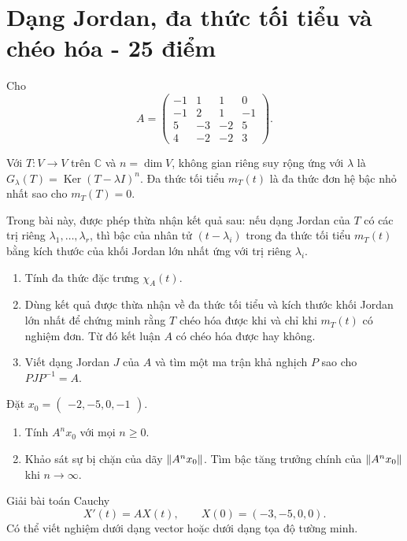 ﻿\documentclass[12pt,a4paper]{article}
\providecommand{\C}{\mathbb{C}}
\DeclareMathOperator{\Ker}{Ker}
\begin{document}
\section[Dạng Jordan, đa thức tối tiểu và chéo hóa]{Dạng Jordan, đa thức tối tiểu và chéo hóa - 25 điểm}

Cho
\[
A=
\begin{pmatrix}
-1&1&1&0\\
-1&2&1&-1\\
5&-3&-2&5\\
4&-2&-2&3
\end{pmatrix}.
\]

Với $T:V\to V$ trên $\C$ và $n=\dim V$, không gian riêng suy rộng ứng với $\lambda$ là $G_\lambda(T)=\Ker(T-\lambda I)^n$. Đa thức tối tiểu $m_T(t)$ là đa thức đơn hệ bậc nhỏ nhất sao cho $m_T(T)=0$.

Trong bài này, được phép thừa nhận kết quả sau: nếu dạng Jordan của \(T\) có các trị riêng
\(\lambda_1,\ldots,\lambda_r\), thì bậc của nhân tử \((t-\lambda_i)\) trong đa thức tối tiểu
\(m_T(t)\) bằng kích thước của khối Jordan lớn nhất ứng với trị riêng \(\lambda_i\).

\begin{problem}[8 điểm]


\begin{enumerate}[label=(\alph*)]
    \item Tính đa thức đặc trưng $\chi_A(t)$.
\item  Dùng kết quả được thừa nhận về đa thức tối tiểu và kích thước khối Jordan lớn nhất để chứng minh rằng \(T\) chéo hóa được khi và chỉ khi \(m_T(t)\) có nghiệm đơn. Từ đó kết luận \(A\) có chéo hóa được hay không.
    \item Viết dạng Jordan $J$ của $A$ và tìm một ma trận khả nghịch $P$ sao cho $PJP^{-1} = A$.
\end{enumerate}

\end{problem}
\begin{problem}[6 điểm]

Đặt
$
x_0=
\begin{pmatrix}
-2,
-5,
0,
-1
\end{pmatrix}.
$
\begin{enumerate}[label=(\alph*)]
\item Tính \(A^n x_0\) với mọi \(n\ge 0\).
\item Khảo sát sự bị chặn của dãy \(\left\lVert A^n x_0 \right\rVert\). Tìm bậc tăng trưởng chính của \(\left\lVert A^n x_0 \right\rVert\) khi \(n\to\infty\).
\end{enumerate}

\end{problem}
\begin{problem}[4 điểm]

Giải bài toán Cauchy
\[
X'(t)=AX(t),\qquad X(0) =(-3,-5,0,0).
\]
Có thể viết nghiệm dưới dạng vector hoặc dưới dạng tọa độ tường minh.

\end{problem}
\end{document}
